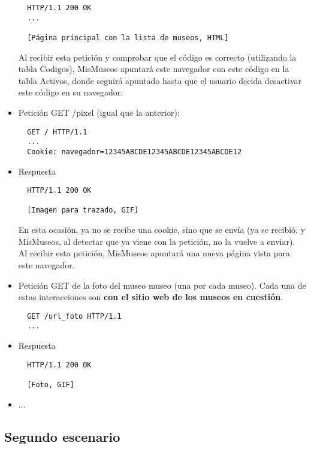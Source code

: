 \begin{itemize}
\begin{verbatim}
  HTTP/1.1 200 OK
  ...

  [Página principal con la lista de museos, HTML]
\end{verbatim}

Al recibir esta petición y comprobar que el código es correcto (utilizando la tabla Codigos), MisMuseos apuntará este navegador con este código en la tabla Activos, donde seguirá apuntado hasta que el usuario decida desactivar este código en su navegador.


\item Petición GET /pixel (igual que la anterior):

\begin{verbatim}
  GET / HTTP/1.1
  ...
  Cookie: navegador=12345ABCDE12345ABCDE12345ABCDE12
\end{verbatim}

\item Respuesta

\begin{verbatim}
  HTTP/1.1 200 OK

  [Imagen para trazado, GIF]
\end{verbatim}

En esta ocasión, ya no se recibe una cookie, sino que se envía (ya se recibió, y MisMuseos, al detectar que ya viene con la petición, no la vuelve a enviar). Al recibir esta petición, MisMuseos apuntará una nueva página vista para este navegador.

\item Petición GET de la foto del museo museo (una por cada museo). Cada una de estas interacciones son {\bf con el sitio web de los museos en cuestión}.

\begin{verbatim}
  GET /url_foto HTTP/1.1
  ...
\end{verbatim}

\item Respuesta

\begin{verbatim}
  HTTP/1.1 200 OK

  [Foto, GIF]
\end{verbatim}

\item ...
\end{itemize}


\subsection*{Segundo escenario}

